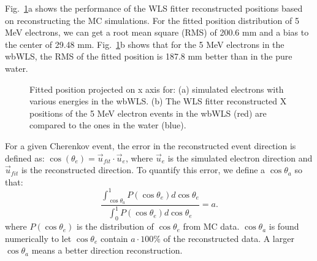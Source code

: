 \documentclass[preprint,12pt]{elsarticle}
\numberwithin{equation}{section}
\begin{document}
Fig.~\ref{WLSFitPos}a shows the performance of the WLS fitter reconstructed positions based on reconstructing the MC simulations. For the fitted position distribution of 5 MeV electrons, we can get a root mean square (RMS) of 200.6 mm and a bias to the center of 29.48 mm. Fig.~\ref{WLSFitPos}b shows that for the 5 MeV electrons in the wbWLS, the RMS of the fitted position is 187.8 mm better than in the pure water.

\begin{figure}[htbp]	
	\centering	
	\caption{\label{WLSFitPos} Fitted position projected on x axis for: (a) simulated electrons with various energies in the wbWLS. (b) The WLS fitter reconstructed X positions of the 5 MeV electron events in the wbWLS (red) are compared to the ones in the water (blue).
	}
\end{figure}

For a given Cherenkov event, the error in the reconstructed event direction is defined as\cite{boulay}: $\cos(\theta_e)=\vec{u}_{fit}\cdot\vec{u}_e$, where $\vec{u}_e$ is the simulated electron direction and $\vec{u}_{fit}$ is the reconstructed direction. To quantify this error, we define a $\cos\theta_{a}$ so that:
\[
\frac{\int_{\cos\theta_{a}}^1 P(\cos\theta_e) d\cos\theta_e}{\int_0^1 P(\cos\theta_e) d\cos\theta_e} = a.
\] 
where $P(\cos\theta_e)$ is the distribution of $\cos\theta_e$ from MC data. $\cos\theta_{a}$ is found numerically to let $\cos\theta_e$ contain $ a\cdot 100\%$ of the reconstructed data. A larger $\cos\theta_{a}$ means a better direction reconstruction.
\end{document}
